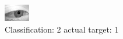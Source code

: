 \begin{figure}[h!]
\begin{center}
\includegraphics[width=0.60\columnwidth]{figures/ID2732_class_2_target_1.png}
\end{center}
\caption{ Classification: 2 actual target: 1}
\label{fig:ID2732_class_2_target_1}
\end{figure}
